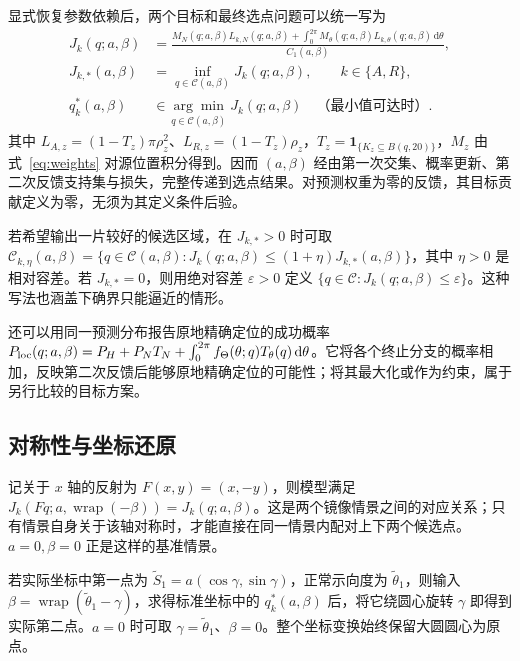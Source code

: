 \documentclass[UTF8,a4paper,zihao=-4,fontset=none]{ctexart}
\numberwithin{equation}{section}
\newcommand{\ind}{\mathbf 1}
\newcommand{\dd}{\,\mathrm d}
\newcommand{\wrap}{\operatorname{wrap}}
\begin{document}
显式恢复参数依赖后，两个目标和最终选点问题可以统一写为
\begin{equation}\label{eq:optimization}
\begin{aligned}
J_k(q;a,\beta)
&=\frac{M_N(q;a,\beta)L_{k,N}(q;a,\beta)
+\displaystyle\int_0^{2\pi}M_\theta(q;a,\beta)L_{k,\theta}(q;a,\beta)\dd\theta}{C_1(a,\beta)},\\
J_{k,*}(a,\beta)&=\inf_{q\in\mathcal C(a,\beta)}J_k(q;a,\beta),\qquad k\in\{A,R\},\\
q_k^*(a,\beta)&\in\underset{q\in\mathcal C(a,\beta)}{\arg\min}\,J_k(q;a,\beta)
\quad\text{（最小值可达时）}.
\end{aligned}
\end{equation}
其中 \(L_{A,z}=(1-T_z)\pi\rho_z^2\)、\(L_{R,z}=(1-T_z)\rho_z\)，\(T_z=\ind_{\{K_z\subseteq B(q,20)\}}\)，\(M_z\) 由式~\eqref{eq:weights} 对源位置积分得到。因而 \((a,\beta)\) 经由第一次交集、概率更新、第二次反馈支持集与损失，完整传递到选点结果。对预测权重为零的反馈，其目标贡献定义为零，无须为其定义条件后验。

若希望输出一片较好的候选区域，在 \(J_{k,*}>0\) 时可取 \(\mathcal C_{k,\eta}(a,\beta)=\{q\in\mathcal C(a,\beta):J_k(q;a,\beta)\le(1+\eta)J_{k,*}(a,\beta)\}\)，其中 \(\eta>0\) 是相对容差。若 \(J_{k,*}=0\)，则用绝对容差 \(\varepsilon>0\) 定义 \(\{q\in\mathcal C:J_k(q;a,\beta)\le\varepsilon\}\)。这种写法也涵盖下确界只能逼近的情形。

还可以用同一预测分布报告原地精确定位的成功概率 \(P_{\rm loc}(q;a,\beta)=P_H+P_NT_N+\int_0^{2\pi}f_\Theta(\theta;q)T_\theta(q)\dd\theta\)。它将各个终止分支的概率相加，反映第二次反馈后能够原地精确定位的可能性；将其最大化或作为约束，属于另行比较的目标方案。

\subsection{对称性与坐标还原}
记关于 \(x\) 轴的反射为 \(F(x,y)=(x,-y)\)，则模型满足 \(J_k(Fq;a,\wrap(-\beta))=J_k(q;a,\beta)\)。这是两个镜像情景之间的对应关系；只有情景自身关于该轴对称时，才能直接在同一情景内配对上下两个候选点。\(a=0,\beta=0\) 正是这样的基准情景。

若实际坐标中第一点为 \(\widetilde S_1=a(\cos\gamma,\sin\gamma)\)，正常示向度为 \(\widetilde\theta_1\)，则输入 \(\beta=\wrap(\widetilde\theta_1-\gamma)\)，求得标准坐标中的 \(q_k^*(a,\beta)\) 后，将它绕圆心旋转 \(\gamma\) 即得到实际第二点。\(a=0\) 时可取 \(\gamma=\widetilde\theta_1\)、\(\beta=0\)。整个坐标变换始终保留大圆圆心为原点。
\end{document}
